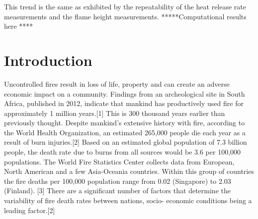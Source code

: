 \documentclass[twoside]{uocthesis}
\begin{document}
{This trend is the same as exhibited by the repeatability of the heat release rate measurements and the flame height measurements.   *****Computational results here ****  

}

\tableofcontents

\listoffigures

\listoftables


\textpages

\chapter{Introduction}
\label{chapter:Introduction}

Uncontrolled fires result in loss of life, property and can create an adverse economic impact on a community.  Findings from an archeological site in South Africa, published in 2012, indicate that mankind has productively used fire for approximately 1 million years.[1]  This is 300 thousand years earlier than previously thought.  Despite mankind’s extensive history with fire, according to the World Health Organization, an estimated 265,000 people die each year as a result of burn injuries.[2]  Based on an estimated global population of 7.3 billion people, the death rate due to burns from all sources would be 3.6 per 100,000 populations.  The World Fire Statistics Center collects data from European, North American and a few Asia-Oceania countries.  Within this group of countries the fire deaths per 100,000 population range from 0.02 (Singapore) to 2.03 (Finland). [3]      There are a significant number of factors that determine the variability of fire death rates between nations, socio- economic conditions being a leading factor.[2] 
 
\end{document}
